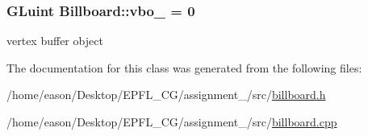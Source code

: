 \subsubsection[{\texorpdfstring{vbo\+\_\+}{vbo_}}]{\setlength{\rightskip}{0pt plus 5cm}G\+Luint Billboard\+::vbo\+\_\+ = 0\hspace{0.3cm}{\ttfamily [private]}}\hypertarget{classBillboard_af1bc171da8c75dc78834bcb805413d9c}{}\label{classBillboard_af1bc171da8c75dc78834bcb805413d9c}


vertex buffer object 



The documentation for this class was generated from the following files\+:\begin{DoxyCompactItemize}
\item 
/home/eason/\+Desktop/\+E\+P\+F\+L\+\_\+\+C\+G/assignment\+\_/src/\hyperlink{billboard_8h}{billboard.\+h}\item 
/home/eason/\+Desktop/\+E\+P\+F\+L\+\_\+\+C\+G/assignment\+\_/src/\hyperlink{billboard_8cpp}{billboard.\+cpp}\end{DoxyCompactItemize}
